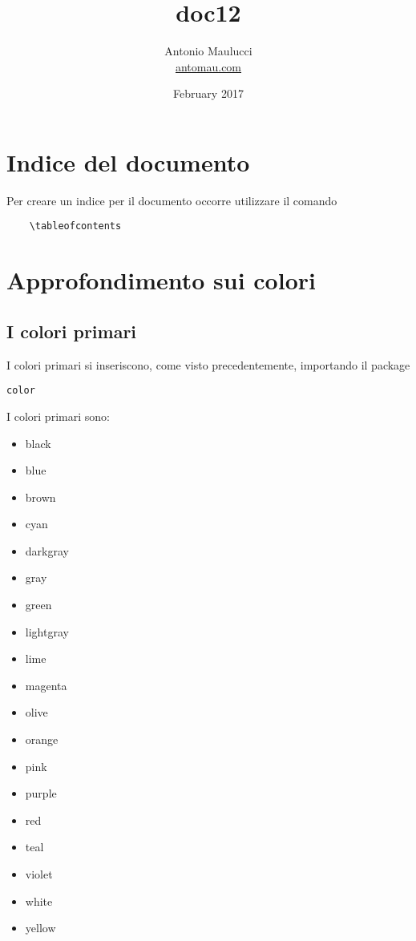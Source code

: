 \documentclass[a4paper, 12pt]{article}
\title{{\color{red} doc12}}
\author{Antonio Maulucci\\ \href{http://www.antomau.com}{antomau.com}}
\date{February 2017}
\begin{document}
\maketitle

\tableofcontents %

\newpage

\section{Indice del documento}

Per creare un indice per il documento occorre utilizzare il comando

\begin{verbatim}
    \tableofcontents
\end{verbatim}

\section{Approfondimento sui colori}

\subsection{I colori primari}

I colori primari si inseriscono, come visto precedentemente, importando il package
\begin{verbatim}
color
\end{verbatim}

I colori primari sono:

\begin{itemize}
    \item black
    \item blue
    \item brown
    \item cyan
    \item darkgray
    \item gray
    \item green
    \item lightgray
    \item lime
    \item magenta
    \item olive
    \item orange
    \item pink
    \item purple
    \item red
    \item teal
    \item violet
    \item white
    \item yellow
\end{itemize}
\end{document}

